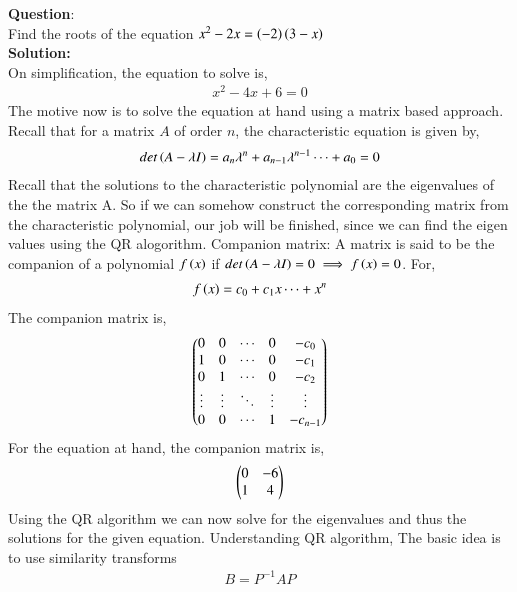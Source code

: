 \documentclass[journal]{IEEEtran}
\begin{document}
\textbf{Question}:\\
Find the roots of the equation $x^2 - 2x = \left(-2\right)\left(3-x\right)$
\\
\textbf{Solution: }\\
On simplification, the equation to solve is,
\begin{align}
  x^2 -4x + 6 = 0
\end{align}
The motive now is to solve the equation at hand using a matrix based approach.
\newline
Recall that for a matrix $A$ of order $n$, the characteristic equation is given by,
\begin{align}
  det\left(A - \lambda I\right) = a_n \lambda ^n + a_{n-1} \lambda ^{n-1} \cdots + a_0 = 0
 \end{align}
 Recall that the solutions to the characteristic polynomial are the eigenvalues of the the matrix
 A. So if we can somehow construct the corresponding matrix from the characteristic polynomial,
 our job will be finished, since we can find the eigen values using the QR alogorithm.
 \newline
 Companion matrix: A matrix is said to be the companion of a polynomial $f\left(x\right)$ if 
$det\left(A - \lambda I\right) = 0 \implies f\left(x\right) = 0$. 
\newline
For,
\begin{align}
  f\left(x\right) = c_0 + c_1 x \cdots + x^n
\end{align}
The companion matrix is,
\begin{align}
  \begin{pmatrix}
    0 & 0 & \cdots & 0 & -c_0\\
    1 & 0 & \cdots & 0 & -c_1\\
    0 & 1 & \cdots & 0 & -c_2\\
    \vdots & \vdots & \ddots & \vdots & \vdots\\
    0 & 0 & \cdots & 1 & -c_{n-1}\\
  \end{pmatrix}
\end{align}
For the equation at hand, the companion matrix is,
\begin{align}
  \begin{pmatrix}
    0 & -6\\
    1 & 4
  \end{pmatrix}
\end{align}
Using the QR algorithm we can now solve for the eigenvalues and thus the solutions 
for the given equation.
\newline
Understanding QR algorithm,
\newline
The basic idea is to use similarity transforms
\begin{align}
  B = P^{-1}AP
\end{align}
\end{document}
